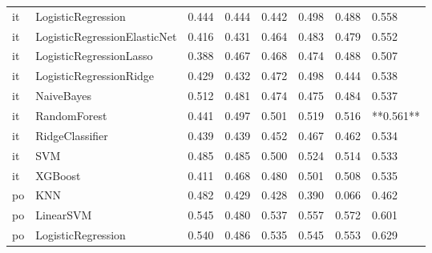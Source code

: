 \begin{tabular}{llllllll}
      it &           LogisticRegression & 0.444 &                     0.444 &                 0.442 &                  0.498 &                                   0.488 &     0.558 \\
      it & LogisticRegressionElasticNet & 0.416 &                     0.431 &                 0.464 &                  0.483 &                                   0.479 &     0.552 \\
      it &      LogisticRegressionLasso & 0.388 &                     0.467 &                 0.468 &                  0.474 &                                   0.488 &     0.507 \\
      it &      LogisticRegressionRidge & 0.429 &                     0.432 &                 0.472 &                  0.498 &                                   0.444 &     0.538 \\
      it &                   NaiveBayes & 0.512 &                     0.481 &                 0.474 &                  0.475 &                                   0.484 &     0.537 \\
      it &                 RandomForest & 0.441 &                     0.497 &                 0.501 &                  0.519 &                                   0.516 & **0.561** \\
      it &              RidgeClassifier & 0.439 &                     0.439 &                 0.452 &                  0.467 &                                   0.462 &     0.534 \\
      it &                          SVM & 0.485 &                     0.485 &                 0.500 &                  0.524 &                                   0.514 &     0.533 \\
      it &                      XGBoost & 0.411 &                     0.468 &                 0.480 &                  0.501 &                                   0.508 &     0.535 \\
      po &                          KNN & 0.482 &                     0.429 &                 0.428 &                  0.390 &                                   0.066 &     0.462 \\
      po &                    LinearSVM & 0.545 &                     0.480 &                 0.537 &                  0.557 &                                   0.572 &     0.601 \\
      po &           LogisticRegression & 0.540 &                     0.486 &                 0.535 &                  0.545 &                                   0.553 &     0.629 \\

\end{tabular}
